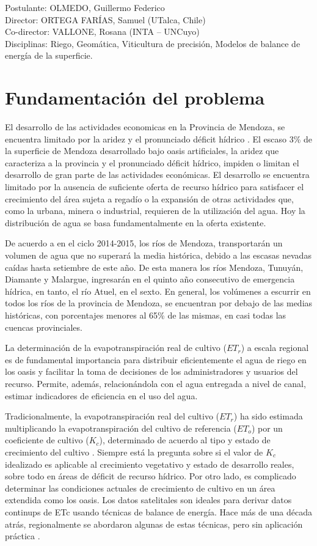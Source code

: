 \documentclass[]{article}
\begin{document}
Postulante: OLMEDO, Guillermo Federico\\
Director: ORTEGA FARÍAS, Samuel (UTalca, Chile)\\ 
Co-director:  VALLONE, Rosana (INTA – UNCuyo)\\
Disciplinas: Riego, Geomática, Viticultura de precisión, Modelos de balance de energía de la superficie.

\section{Fundamentación del problema}

El desarrollo de las actividades economicas en la Provincia de Mendoza, se encuentra limitado por la aridez y el pronunciado déficit hídrico \citep{DGI2014}. El escaso 3\% de la superficie de Mendoza desarrollado bajo oasis artificiales, la aridez que caracteriza a la provincia y el pronunciado déficit hídrico, impiden o limitan el desarrollo de gran parte de las actividades económicas. El desarrollo se encuentra limitado por la ausencia de suficiente oferta de recurso hídrico para satisfacer el crecimiento del área sujeta a regadío o la expansión de otras actividades que, como la urbana, minera o industrial, requieren de la utilización del agua. Hoy la distribución de agua se basa fundamentalmente en la oferta existente. 

De acuerdo a \cite{DGI2014} en el ciclo 2014-2015, los ríos de Mendoza, transportarán un volumen de agua que no superará la media histórica, debido a las escasas nevadas caídas hasta setiembre de este año. De esta manera los ríos Mendoza, Tunuyán, Diamante y Malargue, ingresarán en el quinto año consecutivo de emergencia hídrica, en tanto, el río Atuel, en el sexto. En general, los volúmenes a escurrir en todos los ríos de la provincia de Mendoza, se encuentran por debajo de las medias históricas, con porcentajes menores al 65\% de  las mismas, en casi todas las cuencas provinciales. 

La determinación de la evapotranspiración real de cultivo ($ET_r$) a escala regional es de fundamental importancia para distribuir eficientemente el agua de riego en los oasis y facilitar la toma de decisiones de los administradores y usuarios del recurso. Permite, además, relacionándola con el agua entregada a nivel de canal, estimar indicadores de eficiencia en el uso del agua. 

Tradicionalmente, la evapotranspiración real del cultivo ($ET_r$) ha sido estimada multiplicando la evapotranspiración del cultivo de referencia ($ET_o$) por un coeficiente de cultivo ($K_c$), determinado de acuerdo al tipo y estado de crecimiento del cultivo \citep{Allen2006}. Siempre está la pregunta sobre si el valor de $K_c$ idealizado es aplicable al crecimiento vegetativo y estado de desarrollo reales, sobre todo en áreas de déficit de recurso hídrico. Por otro lado, es complicado determinar las condiciones actuales de crecimiento de cultivo en un área extendida como los oasis. Los datos satelitales son ideales para derivar datos continups de ETc usando técnicas de balance de energía. Hace más de una década atrás, regionalmente se abordaron algunas de estas técnicas, pero sin aplicación práctica \citep{Bermejillo1998}. 
\end{document}
